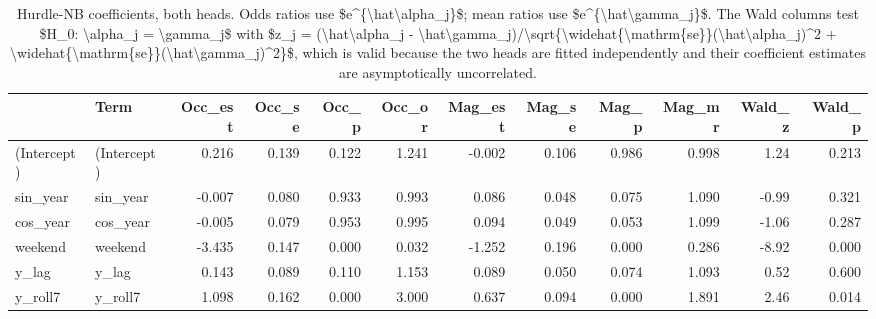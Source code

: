 \begin{table}

\caption{Hurdle-NB coefficients, both heads. Odds ratios use \$e\textasciicircum{}\{\textbackslash{}hat\textbackslash{}alpha\_j\}\$; mean ratios use \$e\textasciicircum{}\{\textbackslash{}hat\textbackslash{}gamma\_j\}\$. The Wald columns test \$H\_0: \textbackslash{}alpha\_j = \textbackslash{}gamma\_j\$ with \$z\_j = (\textbackslash{}hat\textbackslash{}alpha\_j - \textbackslash{}hat\textbackslash{}gamma\_j)/\textbackslash{}sqrt\{\textbackslash{}widehat\{\textbackslash{}mathrm\{se\}\}(\textbackslash{}hat\textbackslash{}alpha\_j)\textasciicircum{}2 + \textbackslash{}widehat\{\textbackslash{}mathrm\{se\}\}(\textbackslash{}hat\textbackslash{}gamma\_j)\textasciicircum{}2\}\$, which is valid because the two heads are fitted independently and their coefficient estimates are asymptotically uncorrelated.}
\centering
\begin{tabular}[t]{llrrrrrrrrrr}
\toprule
  & Term & Occ\_est & Occ\_se & Occ\_p & Occ\_or & Mag\_est & Mag\_se & Mag\_p & Mag\_mr & Wald\_z & Wald\_p\\
\midrule
(Intercept) & (Intercept) & 0.216 & 0.139 & 0.122 & 1.241 & -0.002 & 0.106 & 0.986 & 0.998 & 1.24 & 0.213\\
sin\_year & sin\_year & -0.007 & 0.080 & 0.933 & 0.993 & 0.086 & 0.048 & 0.075 & 1.090 & -0.99 & 0.321\\
cos\_year & cos\_year & -0.005 & 0.079 & 0.953 & 0.995 & 0.094 & 0.049 & 0.053 & 1.099 & -1.06 & 0.287\\
weekend & weekend & -3.435 & 0.147 & 0.000 & 0.032 & -1.252 & 0.196 & 0.000 & 0.286 & -8.92 & 0.000\\
y\_lag & y\_lag & 0.143 & 0.089 & 0.110 & 1.153 & 0.089 & 0.050 & 0.074 & 1.093 & 0.52 & 0.600\\
\addlinespace
y\_roll7 & y\_roll7 & 1.098 & 0.162 & 0.000 & 3.000 & 0.637 & 0.094 & 0.000 & 1.891 & 2.46 & 0.014\\
\bottomrule
\end{tabular}
\end{table}
